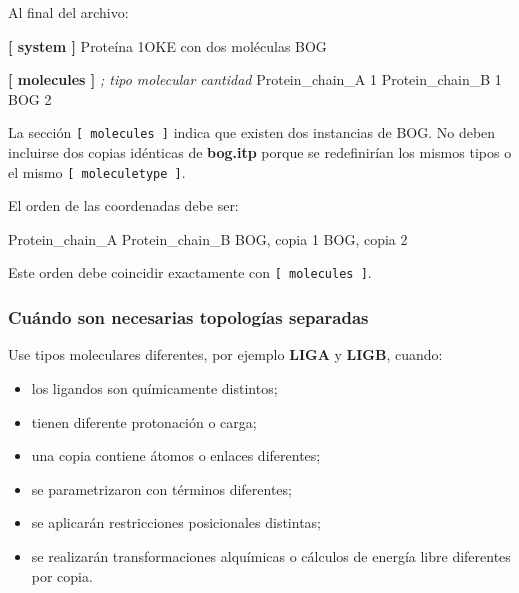 \documentclass[
  spanish,
  11pt,
  a4paper]{article}
\newenvironment{Shaded}{\begin{snugshade}}{\end{snugshade}}
\newcommand{\CommentTok}[1]{\textcolor[rgb]{0.56,0.35,0.01}{\textit{#1}}}
\newcommand{\DataTypeTok}[1]{\textcolor[rgb]{0.13,0.29,0.53}{#1}}
\newcommand{\KeywordTok}[1]{\textcolor[rgb]{0.13,0.29,0.53}{\textbf{#1}}}
\newcommand{\NormalTok}[1]{#1}
\providecommand{\tightlist}{%
  \setlength{\itemsep}{0pt}\setlength{\parskip}{0pt}}
\begin{document}
Al final del archivo:

\begin{Shaded}
\begin{Highlighting}[]
\KeywordTok{[ system ]}
\DataTypeTok{Proteína 1OKE con dos moléculas BOG}

\KeywordTok{[ molecules ]}
\CommentTok{; tipo molecular       cantidad}
\DataTypeTok{Protein\_chain\_A         1}
\DataTypeTok{Protein\_chain\_B         1}
\DataTypeTok{BOG                     2}
\end{Highlighting}
\end{Shaded}

La sección \texttt{{[}\ molecules\ {]}} indica que existen dos
instancias de BOG. No deben incluirse dos copias idénticas de
\textbf{bog.itp} porque se redefinirían los mismos tipos o el mismo
\texttt{{[}\ moleculetype\ {]}}.

El orden de las coordenadas debe ser:

\begin{Shaded}
\begin{Highlighting}[]
\NormalTok{Protein\_chain\_A}
\NormalTok{Protein\_chain\_B}
\NormalTok{BOG, copia 1}
\NormalTok{BOG, copia 2}
\end{Highlighting}
\end{Shaded}

Este orden debe coincidir exactamente con \texttt{{[}\ molecules\ {]}}.

\subsubsection{Cuándo son necesarias topologías
separadas}\label{cuuxe1ndo-son-necesarias-topologuxedas-separadas}

Use tipos moleculares diferentes, por ejemplo \textbf{LIGA} y
\textbf{LIGB}, cuando:

\begin{itemize}
\tightlist
\item
  los ligandos son químicamente distintos;
\item
  tienen diferente protonación o carga;
\item
  una copia contiene átomos o enlaces diferentes;
\item
  se parametrizaron con términos diferentes;
\item
  se aplicarán restricciones posicionales distintas;
\item
  se realizarán transformaciones alquí\-micas o cálculos de energía
  libre diferentes por copia.
\end{itemize}
\end{document}
